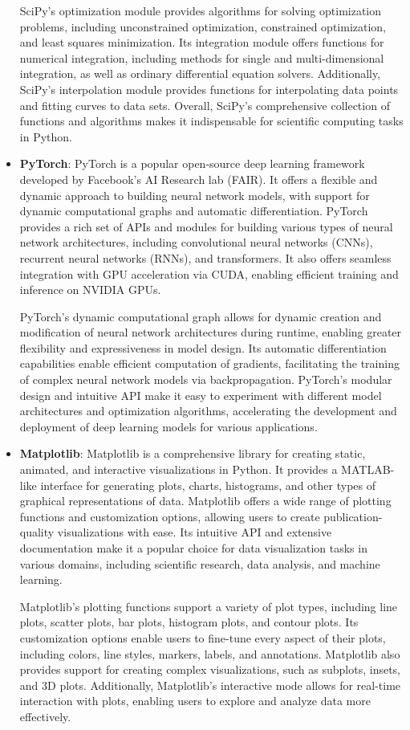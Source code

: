 \begin{itemize}
    SciPy's optimization module provides algorithms for solving optimization problems, including unconstrained optimization, constrained optimization, and least squares minimization. Its integration module offers functions for numerical integration, including methods for single and multi-dimensional integration, as well as ordinary differential equation solvers. Additionally, SciPy's interpolation module provides functions for interpolating data points and fitting curves to data sets. Overall, SciPy's comprehensive collection of functions and algorithms makes it indispensable for scientific computing tasks in Python.
    
    \item \textbf{PyTorch}: PyTorch is a popular open-source deep learning framework developed by Facebook's AI Research lab (FAIR). It offers a flexible and dynamic approach to building neural network models, with support for dynamic computational graphs and automatic differentiation. PyTorch provides a rich set of APIs and modules for building various types of neural network architectures, including convolutional neural networks (CNNs), recurrent neural networks (RNNs), and transformers. It also offers seamless integration with GPU acceleration via CUDA, enabling efficient training and inference on NVIDIA GPUs.
    
    PyTorch's dynamic computational graph allows for dynamic creation and modification of neural network architectures during runtime, enabling greater flexibility and expressiveness in model design. Its automatic differentiation capabilities enable efficient computation of gradients, facilitating the training of complex neural network models via backpropagation. PyTorch's modular design and intuitive API make it easy to experiment with different model architectures and optimization algorithms, accelerating the development and deployment of deep learning models for various applications.
    
    \item \textbf{Matplotlib}: Matplotlib is a comprehensive library for creating static, animated, and interactive visualizations in Python. It provides a MATLAB-like interface for generating plots, charts, histograms, and other types of graphical representations of data. Matplotlib offers a wide range of plotting functions and customization options, allowing users to create publication-quality visualizations with ease. Its intuitive API and extensive documentation make it a popular choice for data visualization tasks in various domains, including scientific research, data analysis, and machine learning.
    
    Matplotlib's plotting functions support a variety of plot types, including line plots, scatter plots, bar plots, histogram plots, and contour plots. Its customization options enable users to fine-tune every aspect of their plots, including colors, line styles, markers, labels, and annotations. Matplotlib also provides support for creating complex visualizations, such as subplots, insets, and 3D plots. Additionally, Matplotlib's interactive mode allows for real-time interaction with plots, enabling users to explore and analyze data more effectively.
  \end{itemize}
  
